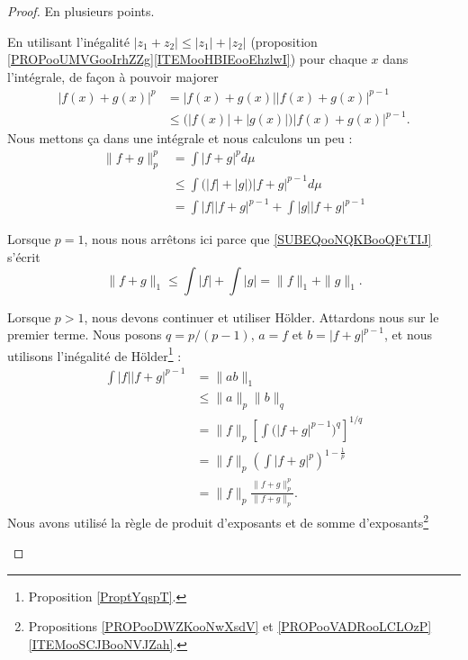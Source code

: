 \begin{proof}
	En plusieurs points.
	\begin{subproof}
		En utilisant l'inégalité \( | z_1+z_2 |\leq | z_1 |+| z_2 |\) (proposition \ref{PROPooUMVGooIrhZZg}\ref{ITEMooHBIEooEhzlwI}) pour chaque \( x\) dans l'intégrale, de façon à pouvoir majorer
		\begin{subequations}
			\begin{align}
				| f(x)+g(x) |^p & =| f(x)+g(x) | |f(x)+g(x) |^{p-1}                     \\
				                & \leq\big( | f(x) |+| g(x) | \big)| f(x)+g(x) |^{p-1}.
			\end{align}
		\end{subequations}
		Nous mettons ça dans une intégrale et nous calculons un peu :
		\begin{subequations}        \label{SUBEQSooGWMTooDBXSgL}
			\begin{align}
				\| f+g \|^p_p & =\int| f+g |^pd\mu                                                         \\
				              & \leq \int\big( | f |+| g | \big)| f+g |^{p-1}d\mu                          \\
				              & =\int| f | |f+g |^{p-1}+\int| g | |f+g |^{p-1} \label{SUBEQooNQKBooQFtTIJ}
			\end{align}
		\end{subequations}

		Lorsque \( p=1\), nous nous arrêtons ici parce que \eqref{SUBEQooNQKBooQFtTIJ} s'écrit
		\begin{equation}
			\| f+g \|_1\leq\int| f |+\int| g |=\| f \|_1+\| g \|_1.
		\end{equation}

		Lorsque \( p>1\), nous devons continuer et utiliser Hölder. Attardons nous sur le premier terme. Nous posons \( q=p/(p-1)\), \( a=f\) et \( b=| f+g |^{p-1}\), et nous utilisons l'inégalité de Hölder\footnote{Proposition \ref{ProptYqspT}.} :
		\begin{subequations}        \label{SUBEQSooFINUooQfIdMS}
			\begin{align}
				\int| f | |f+g |^{p-1} & =\| ab \|_1                                                      \\
				                       & \leq \| a \|_p\| b \|_q                                          \\
				                       & =\| f \|_p \left[ \int \big( | f+g |^{p-1} \big)^q \right]^{1/q} \\
				                       & =\| f \|_p\left( \int| f+g |^p \right)^{1-\frac{1}{ p }}         \\
				                       & =\| f \|_p\frac{ \| f+g \|_p^p }{ \| f+g \|_p }.
			\end{align}
		\end{subequations}
		Nous avons utilisé la règle de produit d'exposants et de somme d'exposants\footnote{Propositions \ref{PROPooDWZKooNwXsdV} et \ref{PROPooVADRooLCLOzP}\ref{ITEMooSCJBooNVJZah}.}


\end{subproof}
\end{proof}
